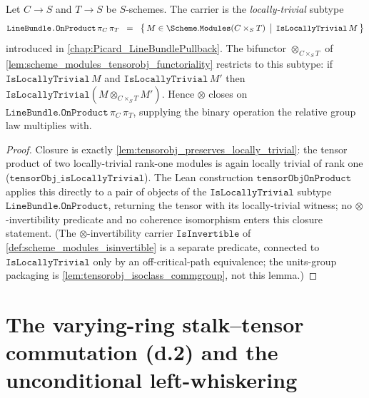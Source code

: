 \begin{lemma}\leanok
  \label{lem:tensorobj_lift_onproduct}
  Let \(C \to S\) and \(T \to S\) be \(S\)-schemes. The carrier is the
  \emph{locally-trivial} subtype
  \[
    \texttt{LineBundle.OnProduct}\,\pi_C\,\pi_T
    \;\;=\;\;
    \bigl\{\,M \in \Scheme.\mathtt{Modules}(C \times_S T)
            \,\bigm|\, \mathtt{IsLocallyTrivial}\,M \,\bigr\}
  \]
  introduced in \cref{chap:Picard_LineBundlePullback}. The bifunctor
  \(\otimes_{C \times_S T}\) of
  \cref{lem:scheme_modules_tensorobj_functoriality} restricts to this subtype:
  if \(\mathtt{IsLocallyTrivial}\,M\) and \(\mathtt{IsLocallyTrivial}\,M'\) then
  \(\mathtt{IsLocallyTrivial}(M \otimes_{C \times_S T} M')\). Hence \(\otimes\)
  closes on \(\texttt{LineBundle.OnProduct}\,\pi_C\,\pi_T\), supplying the binary
  operation the relative group law multiplies with.
\end{lemma}

\begin{proof}
  \leanok
  Closure is exactly
  \cref{lem:tensorobj_preserves_locally_trivial}: the tensor product of two
  locally-trivial rank-one modules is again locally trivial of rank one
  (\(\mathtt{tensorObj\_isLocallyTrivial}\)). The Lean construction
  \(\mathtt{tensorObjOnProduct}\) applies this directly to a pair of objects of
  the \(\mathtt{IsLocallyTrivial}\) subtype \(\texttt{LineBundle.OnProduct}\),
  returning the tensor with its locally-trivial witness; no
  \(\otimes\)-invertibility predicate and no coherence isomorphism enters this
  closure statement. (The \(\otimes\)-invertibility carrier
  \(\mathtt{IsInvertible}\) of \cref{def:scheme_modules_isinvertible} is a
  separate predicate, connected to \(\mathtt{IsLocallyTrivial}\) only by an
  off-critical-path equivalence; the units-group packaging is
  \cref{lem:tensorobj_isoclass_commgroup}, not this lemma.)
\end{proof}

\section{The varying-ring stalk--tensor commutation (d.2) and the unconditional
left-whiskering}
\label{sec:tensorobj_stalk_tensor}

